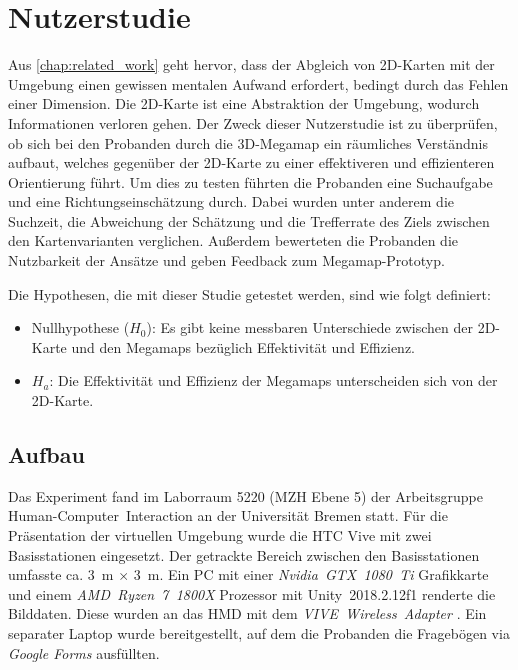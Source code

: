 \chapter{Nutzerstudie}
\label{chap:evaluation}
Aus \autoref{chap:related_work} geht hervor, dass der Abgleich von 2D-Karten mit der Umgebung einen gewissen mentalen Aufwand erfordert, bedingt durch das Fehlen einer Dimension.
Die 2D-Karte ist eine Abstraktion der Umgebung, wodurch Informationen verloren gehen.
Der Zweck dieser Nutzerstudie ist zu überprüfen, ob sich bei den Probanden durch die 3D-Megamap ein räumliches Verständnis aufbaut, welches gegenüber der 2D-Karte zu einer effektiveren und effizienteren Orientierung führt.
Um dies zu testen führten die Probanden eine Suchaufgabe und eine Richtungseinschätzung durch.
Dabei wurden unter anderem die Suchzeit, die Abweichung der Schätzung und die Trefferrate des Ziels zwischen den Kartenvarianten verglichen.
Außerdem bewerteten die Probanden die Nutzbarkeit der Ansätze und geben Feedback zum Megamap-Prototyp.

Die Hypothesen, die mit dieser Studie getestet werden, sind wie folgt definiert:
\begin{itemize}
    \item Nullhypothese ($H_0$): Es gibt keine messbaren Unterschiede zwischen der 2D-Karte und den Megamaps bezüglich Effektivität und Effizienz.
    \item $H_a$: Die Effektivität und Effizienz der Megamaps unterscheiden sich von der 2D-Karte.
\end{itemize}

\section{Aufbau}
Das Experiment fand im Laborraum 5220 (MZH Ebene 5) der Arbeitsgruppe Human-Com\-pu\-ter~Inter\-action an der Universität Bremen statt.
Für die Präsentation der virtuellen Umgebung wurde die HTC Vive mit zwei Basisstationen eingesetzt.
Der getrackte Bereich zwischen den Basisstationen umfasste ca. \SI{3}{\metre} $\times$ \SI{3}{\metre}.
Ein PC mit einer \emph{Nvidia~GTX~1080~Ti} Grafikkarte und einem \emph{AMD~Ryzen~7~1800X} Prozessor mit Unity~2018.2.12f1 renderte die Bilddaten.
Diese wurden an das HMD mit dem \emph{VIVE~Wireless~Adapter} \parencite{HTCCorporation2018b}.
Ein separater Laptop wurde bereitgestellt, auf dem die Probanden die Fragebögen via \emph{Google Forms} ausfüllten.

